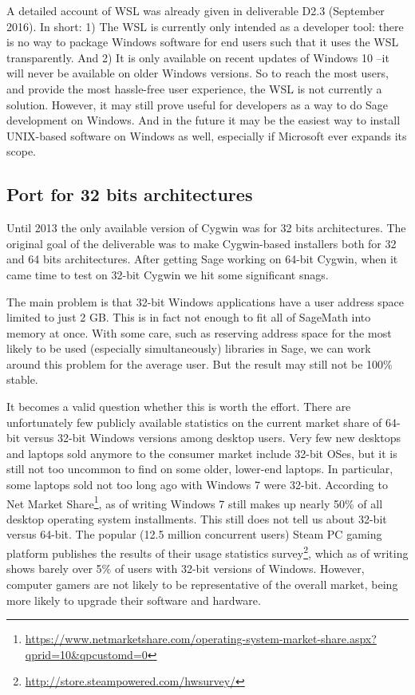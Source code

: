 A detailed account of WSL was already given in deliverable D2.3
(September 2016). In short: 1) The WSL is currently only intended as a
developer tool: there is no way to package Windows software for end
users such that it uses the WSL transparently. And 2) It is only
available on recent updates of Windows 10 --it will never be available
on older Windows versions. So to reach the most users, and provide the
most hassle-free user experience, the WSL is not currently a solution.
However, it may still prove useful for developers as a way to do Sage
development on Windows. And in the future it may be the easiest way to
install UNIX-based software on Windows as well, especially if Microsoft
ever expands its scope.

\hypertarget{port-for-32-bits-architectures}{%
\subsection{Port for 32 bits
architectures}\label{port-for-32-bits-architectures}}

Until 2013 the only available version of Cygwin was for 32 bits
architectures. The original goal of the deliverable was to make
Cygwin-based installers both for 32 and 64 bits architectures. After
getting Sage working on 64-bit Cygwin, when it came time to test on
32-bit Cygwin we hit some significant snags.

The main problem is that 32-bit Windows applications have a user address
space limited to just 2 GB. This is in fact not enough to fit all of
SageMath into memory at once. With some care, such as reserving address
space for the most likely to be used (especially simultaneously)
libraries in Sage, we can work around this problem for the average user.
But the result may still not be 100\% stable.

It becomes a valid question whether this is worth the effort. There are
unfortunately few publicly available statistics on the current market
share of 64-bit versus 32-bit Windows versions among desktop users. Very
few new desktops and laptops sold anymore to the consumer market include
32-bit OSes, but it is still not too uncommon to find on some older,
lower-end laptops. In particular, some laptops sold not too long ago
with Windows 7 were 32-bit. According to Net Market Share\footnote{\url{https://www.netmarketshare.com/operating-system-market-share.aspx?qprid=10\&qpcustomd=0}},
as of writing Windows 7 still makes up nearly 50\% of all desktop
operating system installments. This still does not tell us about 32-bit
versus 64-bit. The popular (12.5 million concurrent users) Steam PC
gaming platform publishes the results of their usage statistics
survey\footnote{\url{http://store.steampowered.com/hwsurvey/}}, which as
of writing shows barely over 5\% of users with 32-bit versions of
Windows. However, computer gamers are not likely to be representative of
the overall market, being more likely to upgrade their software and
hardware.

